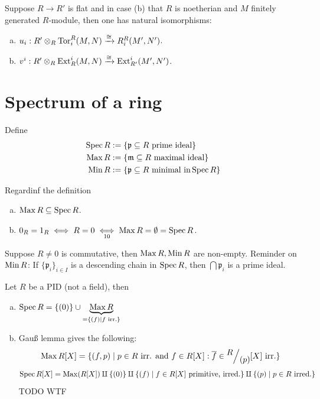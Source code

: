 \documentclass[a4paper]{report}
\begin{document}
\begin{thm}
  Suppose $R \to R'$ is flat and in case (b) that $R$ is noetherian and $M$ finitely generated $R$-module, then one has natural isomorphisms:
  \begin{enumerate}[(a)]
\item $u_{i}: R' \otimes_{R} \operatorname{Tor}_{i}^{R}(M,N) \xrightarrow \cong R_{i}^{R}(M',N')$.
\item $v^{i}: R' \otimes_{R} \operatorname{Ext}_{R}^{i}(M,N) \xrightarrow \cong \operatorname{Ext}_{R'}^{i}(M',N')$.
  \end{enumerate}

\end{thm}

\section{Spectrum of a ring}
\begin{defi}
Define \begin{align*}
\operatorname{Spec} R &:= \{\mathfrak p \subseteq R \text{ prime ideal}\} \\
\operatorname{Max} R &:= \{\mathfrak m \subseteq R \text{ maximal ideal}\} \\
\operatorname{Min} R &:= \{\mathfrak p \subseteq R \text{ minimal in} \operatorname{Spec} R\}
\end{align*}
\end{defi}
\begin{rem*} Regardinf the definition
\begin{enumerate}[(a)]
  \item $\operatorname{Max} R \subseteq \operatorname{Spec} R$.
        \item $0_{R} = 1_{R} \iff R=0 \underset{10}\iff \operatorname{Max} R = \emptyset = \operatorname{Spec} R$.
\end{enumerate}
\end{rem*}

\begin{thm}
  Suppose $R \ne 0$ is commutative, then $\operatorname{Max} R, \operatorname{Min} R$ are non-empty. Reminder on $\operatorname{Min} R$: If $\{\mathfrak p_{i}\}_{i \in I}$ is a descending chain in $\operatorname{Spec} R$, then $\bigcap \mathfrak p_{i}$ is a prime ideal.
\end{thm}
\begin{exmp*}
  Let $R$ be a PID (not a field), then
  \begin{enumerate}[(a)]
    \item $\operatorname{Spec} R = \{(0)\} \cup \underbrace{\operatorname{Max} R}_{=\{(f) \mid f \text{ irr.}\}}$
    \item Gauß lemma gives the following: \[\Max R[X] = \{(f,p) \mid p \in R \text{ irr. and } f \in R[X] : \bar f \in \fak R{(p)}[X] \text{ irr.}\}\]
          \[\operatorname{Spec} R[X] = \operatorname{Max}(R[X]) \amalg \{(0)\} \amalg \{(f) \mid f \in R[X] \text{ primitive, irred.} \} \amalg \{(p) \mid p \in R \text{ irred.}\}\] TODO WTF
  \end{enumerate}
\end{exmp*}
\end{document}
